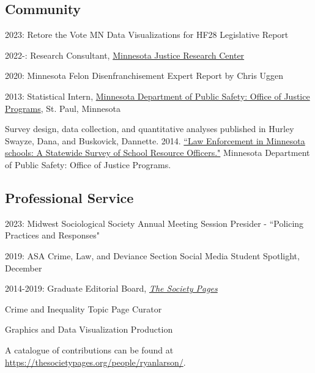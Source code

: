 \documentclass[letterpaper]{article}
\renewenvironment{itemize}{
  \begin{list}{}{
    \setlength{\leftmargin}{1.5em}
  }
}{
  \end{list}
}
\begin{document}
\subsection*{Community}

\begin{itemize}

\item 2023: Retore the Vote MN Data Visualizations for HF28 Legislative Report
\item 2022-: Research Consultant, \href{https://www.mnjrc.org/about-us}{Minnesota Justice Research Center}

\item 2020: Minnesota Felon Disenfranchisement Expert Report by Chris Uggen 

\item 2013: Statistical Intern, \href{https://dps.mn.gov/divisions/ojp/statistical-analysis-center/Pages/default.aspx}{Minnesota Department of Public Safety: Office of Justice Programs}, St. Paul, Minnesota
\begin{itemize}
	\item Survey design, data collection, and quantitative analyses published in Hurley Swayze, Dana, and  Buskovick, Dannette. 2014. \href{https://dps.mn.gov/divisions/ojp/forms-documents/Documents/SRO20REPORT.pdf}{``Law Enforcement in Minnesota schools: A Statewide Survey of School Resource Officers."} Minnesota Department of Public Safety: Office of Justice Programs.
\end{itemize}

\end{itemize}

\subsection*{Professional Service}

\begin{itemize}

\item 2023: Midwest Sociological Society Annual Meeting Session Presider - ``Policing Practices and Responses"

\item 2019: ASA Crime, Law, and Deviance Section Social Media Student Spotlight, December

\item  2014-2019:  Graduate Editorial Board, \href{http://thesocietypages.org/}{\textit{The Society Pages}}
\begin{itemize}
\item Crime and Inequality Topic Page Curator
\item Graphics and Data Visualization Production
\item A catalogue of contributions can be found at \href{https://thesocietypages.org/people/ryanlarson/}{https://thesocietypages.org/people/ryanlarson/}.
\end{itemize}

\end{itemize}
\end{document}
